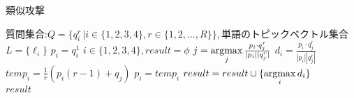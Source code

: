 \documentclass{jsarticle}
\theoremstyle{definition}
\newcommand{\argmax}{\mathop{\rm argmax}\limits}
\begin{document}
\begin{algorithm}
\caption{類似攻撃}
\begin{algorithmic}[1]
    \Require 質問集合:$Q=\{q^r_i\, | i \in \{1,2,3,4\},r \in \{1,2, \dots ,R\}\},$単語のトピックベクトル集合$L=\{\ell_i\}$
    \State $p_i= q^1_i \, \, i \in \{1,2,3,4\} , result = \phi $
		\State $j = \argmax_j \frac{p_i \cdot q^r_j}{|p_i||q^r_j|}$
		\State $d_i = \frac{p_i \cdot q^r_j}{|p_i||q^r_j|}$
		\State $temp_i = \frac{1}{r}(p_i(r-1) + q_j)$
		\EndFor
		\State $p_i = temp_i $
		\EndFor
    \State $result =result \cup \{\argmax_{i}d_i\}$
    \EndFor　\\
    \Return $result$
\end{algorithmic}
\end{algorithm}
\end{document}
